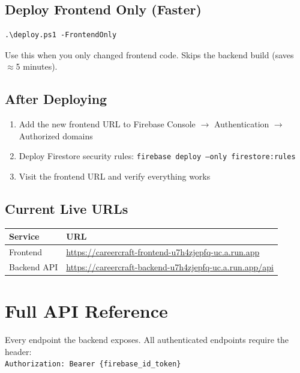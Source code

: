 \documentclass[12pt, a4paper]{report}
\newcommand{\code}[1]{\texttt{\small #1}}
\begin{document}
\section{Deploy Frontend Only (Faster)}

\begin{lstlisting}[style=bashstyle]
.\deploy.ps1 -FrontendOnly
\end{lstlisting}

Use this when you only changed frontend code.  Skips the backend build (saves $\approx$5 minutes).

\section{After Deploying}

\begin{enumerate}
  \item Add the new frontend URL to Firebase Console $\to$ Authentication $\to$ Authorized domains
  \item Deploy Firestore security rules: \code{firebase deploy --only firestore:rules}
  \item Visit the frontend URL and verify everything works
\end{enumerate}

\section{Current Live URLs}

\begin{center}
\begin{tabular}{ll}
\toprule
\textbf{Service} & \textbf{URL} \\
\midrule
Frontend & \small\url{https://careercraft-frontend-u7h4zjepfq-uc.a.run.app} \\
Backend API & \small\url{https://careercraft-backend-u7h4zjepfq-uc.a.run.app/api} \\
\bottomrule
\end{tabular}
\end{center}

\chapter{Full API Reference}

Every endpoint the backend exposes.  All authenticated endpoints require the
header:\\[4pt]
\code{Authorization: Bearer \{firebase\_id\_token\}}
\end{document}
